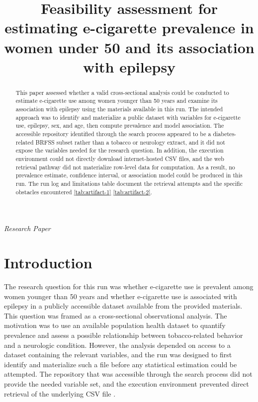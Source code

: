 \documentclass[11pt]{article}
\title{Feasibility assessment for estimating e-cigarette prevalence in women under 50 and its association with epilepsy}
\author{}
\date{}
\begin{document}
\maketitle

\begin{center}\small\textit{Research Paper}\end{center}

\begin{abstract}

This paper assessed whether a valid cross-sectional analysis could be conducted to estimate e-cigarette use among women younger than 50 years and examine its association with epilepsy using the materials available in this run. The intended approach was to identify and materialize a public dataset with variables for e-cigarette use, epilepsy, sex, and age, then compute prevalence and model association. The accessible repository identified through the search process appeared to be a diabetes-related BRFSS subset rather than a tobacco or neurology extract, and it did not expose the variables needed for the research question. In addition, the execution environment could not directly download internet-hosted CSV files, and the web retrieval pathway did not materialize row-level data for computation. As a result, no prevalence estimate, confidence interval, or association model could be produced in this run. The run log and limitations table document the retrieval attempts and the specific obstacles encountered \ref{tab:artifact-1} \ref{tab:artifact-2}.

\end{abstract}

\section{Introduction}
The research question for this run was whether e-cigarette use is prevalent among women younger than 50 years and whether e-cigarette use is associated with epilepsy in a publicly accessible dataset available from the provided materials. This question was framed as a cross-sectional observational analysis. The motivation was to use an available population health dataset to quantify prevalence and assess a possible relationship between tobacco-related behavior and a neurologic condition. However, the analysis depended on access to a dataset containing the relevant variables, and the run was designed to first identify and materialize such a file before any statistical estimation could be attempted. The repository that was accessible through the search process did not provide the needed variable set, and the execution environment prevented direct retrieval of the underlying CSV file \cite{ref1}.
\end{document}
